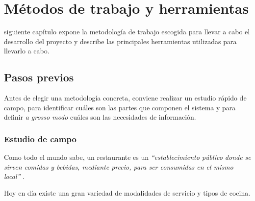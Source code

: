 
\chapter{Métodos de trabajo y herramientas}
\label{chap:methods}
 siguiente capítulo expone la metodología de trabajo escogida para
llevar a cabo el desarrollo del proyecto y describe las principales 
herramientas utilizadas para llevarlo a cabo.

\section{Pasos previos}
Antes de elegir una metodología concreta, conviene realizar un estudio rápido
de campo, para identificar cuáles son las partes que componen el sistema y para
definir \emph{a grosso modo} cuáles son las necesidades de información.

  \subsection{Estudio de campo}
  \label{sec:fieldStudy}
Como todo el mundo sabe, un restaurante es un \emph{``establecimiento público 
donde se sirven comidas y bebidas, mediante precio, para ser consumidas en el
mismo local''} \cite{bib:rae}.

Hoy en día existe una gran variedad de modalidades de servicio y tipos de
cocina.

